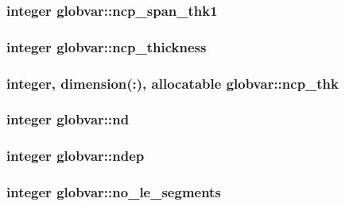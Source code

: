 \subsubsection[{ncp\+\_\+span\+\_\+thk1}]{\setlength{\rightskip}{0pt plus 5cm}integer globvar\+::ncp\+\_\+span\+\_\+thk1}\label{namespaceglobvar_aeb3dab07da1184657a2306f02e490440}
\hypertarget{namespaceglobvar_a6d8ea5ccd5fef3d661bbfae6de774947}{}
\subsubsection[{ncp\+\_\+thickness}]{\setlength{\rightskip}{0pt plus 5cm}integer globvar\+::ncp\+\_\+thickness}\label{namespaceglobvar_a6d8ea5ccd5fef3d661bbfae6de774947}
\hypertarget{namespaceglobvar_ac94874cf7f449d0711f2b40bce778862}{}
\subsubsection[{ncp\+\_\+thk}]{\setlength{\rightskip}{0pt plus 5cm}integer, dimension(\+:), allocatable globvar\+::ncp\+\_\+thk}\label{namespaceglobvar_ac94874cf7f449d0711f2b40bce778862}
\hypertarget{namespaceglobvar_abefec70ea6b9f0d35b7cc330cd8ed601}{}
\subsubsection[{nd}]{\setlength{\rightskip}{0pt plus 5cm}integer globvar\+::nd}\label{namespaceglobvar_abefec70ea6b9f0d35b7cc330cd8ed601}
\hypertarget{namespaceglobvar_aee337eea7ab22193aa48bfd1dfe306d1}{}
\subsubsection[{ndep}]{\setlength{\rightskip}{0pt plus 5cm}integer globvar\+::ndep}\label{namespaceglobvar_aee337eea7ab22193aa48bfd1dfe306d1}
\hypertarget{namespaceglobvar_a64988ba2eed57cebc3d95939e33ee75e}{}
\subsubsection[{no\+\_\+le\+\_\+segments}]{\setlength{\rightskip}{0pt plus 5cm}integer globvar\+::no\+\_\+le\+\_\+segments}\label{namespaceglobvar_a64988ba2eed57cebc3d95939e33ee75e}
\hypertarget{namespaceglobvar_ab80f0f7f25dc40712c12c67edf2c7112}{}
